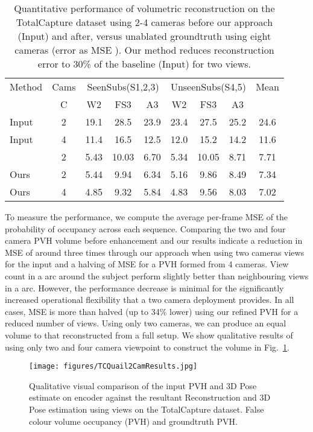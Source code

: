 \documentclass{bmvc2k}
\newcommand{\squeezeup}{\vspace{-2mm}}
\begin{document}
\begin{table}[htb]
\centering
{
\small
\begin{tabular}{lcccccccc}
\hline
Method&Cams &\multicolumn{3}{c}{SeenSubs(S1,2,3)}&\multicolumn{3}{c}{UnseenSubs(S4,5)} & Mean   \\
                             & C&W2  &FS3  & A3  &W2  &FS3  &A3  &       \\ \hline
Input                    &2 &19.1&28.5 &23.9 &23.4&27.5 &25.2&24.6   \\
Input                     & 4&11.4&16.5 &12.5 &12.0& 15.2&14.2&11.6  \\ \hline
~\cite{gilbert2018volumetric}& 2&5.43&10.03&6.70 &5.34&10.05&8.71&7.71 \\ \hline
Ours                     &2 &5.44& 9.94&6.34 &5.16&9.86 &8.49&7.34  \\   
Ours                     &4 &4.85& 9.32&5.84 &4.83&9.56 &8.03&7.02  \\   \hline
\end{tabular}
}
\caption{ Quantitative performance of volumetric reconstruction on the TotalCapture dataset using 2-4 cameras before our approach (Input) and after, versus unablated groundtruth using eight cameras (error as MSE ).  Our method reduces reconstruction error to 30\% of the baseline (Input) for two views.}
\label{tab:QuantTC}
\end{table}
To measure the performance, we compute the average per-frame MSE of the probability of occupancy across each sequence. Comparing the two and four camera PVH volume before enhancement and our results indicate a reduction in MSE of around three times through our approach when using two cameras views for the input and a halving of MSE for a PVH formed from 4 cameras. View count  in a  arc around the subject perform slightly better than  neighbouring views in a  arc. However, the performance decrease is minimal for the significantly increased operational flexibility that a two camera deployment provides. In all cases, MSE is more than halved (up to 34\% lower) using our refined PVH for a reduced number of views.  Using only two cameras, we can produce an equal volume to that reconstructed from a full   setup. We show qualitative results of using only two and four camera viewpoint to construct the volume in Fig.~\ref{fig:TCQuail2CamResults}.

\begin{figure}[htb]
\centering
\texttt{[image: figures/TCQuail2CamResults.jpg]}
\caption{Qualitative visual comparison of the input PVH and 3D Pose estimate on encoder against the resultant Reconstruction and 3D Pose estimation using  views on the TotalCapture dataset. False colour volume occupancy (PVH) and groundtruth  PVH.}
\label{fig:TCQuail2CamResults}
\end{figure}
\squeezeup
\squeezeup
\end{document}
